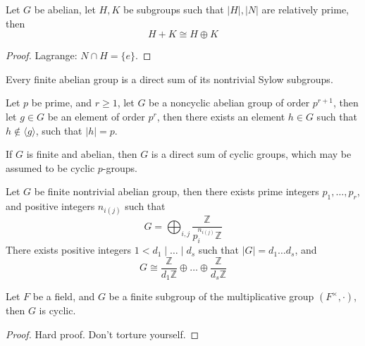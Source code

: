 \documentclass[openany]{book}
\newcommand{\Z}{\mathbb{Z}}
\newcommand{\la}{\langle}
\newcommand{\ra}{\rangle}
\begin{document}
\begin{prop}
    Let $G$ be abelian, let $H,K$ be subgroups such that $|H|, |N|$ are relatively prime, then 
    \begin{equation*}
        H+K\cong H\oplus K
    \end{equation*}
\end{prop}
\begin{proof}
    Lagrange: $N\cap H=\{e\}$.
\end{proof}
\begin{prop}
    Every finite abelian group is a direct sum of its nontrivial Sylow subgroups.
\end{prop}


\begin{prop}
    Let $p$ be prime, and $r\geq 1$, let $G$ be a noncyclic abelian group of order $p^{r+1}$, then let $g\in G$ be an element of order $p^r$, then there exists an element $h\in G$ such that $h\not\in\la g\ra$, such that $|h|=p$.

    If $G$ is finite and abelian, then $G$ is a direct sum of cyclic groups, which may be assumed to be cyclic $p$-groups.
\end{prop}



\begin{thm}
    Let $G$ be finite nontrivial abelian group, then there exists prime integers $p_1,\dots, p_r$, and positive integers $n_{i(j)}$ such that 
    \begin{equation*}
        G=\bigoplus_{i,j}\frac{\Z}{p_i^{n_{i(j)}}\Z}
    \end{equation*}
    There exists positive integers $1<d_1\mid \dots\mid d_s$ such that $|G|=d_1\dots d_s$, and 
    \begin{equation*}
        G\cong\frac{\Z}{d_1\Z}\oplus\dots\oplus\frac{\Z}{d_s\Z}
    \end{equation*}
\end{thm}



\begin{thm}
    Let $F$ be a field, and $G$ be a finite subgroup of the multiplicative group $(F^\times, \cdot)$, then $G$ is cyclic.
\end{thm}
\begin{proof}
    Hard proof. Don't torture yourself.
\end{proof}
\end{document}
